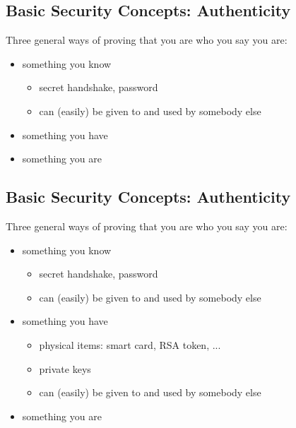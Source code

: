 \documentclass[xga]{xdvislides}
\begin{document}
\subsection{Basic Security Concepts: Authenticity}
Three general ways of proving that you are who you say you are:
\begin{itemize}
	\item something you know
		\begin{itemize}
			\item secret handshake, password
			\item can (easily) be given to and used by somebody else
		\end{itemize}
	\item something you have
	\item something you are
\end{itemize}

\subsection{Basic Security Concepts: Authenticity}
Three general ways of proving that you are who you say you are:
\begin{itemize}
	\item something you know
		\begin{itemize}
			\item secret handshake, password
			\item can (easily) be given to and used by somebody else
		\end{itemize}
	\item something you have
		\begin{itemize}
			\item physical items: smart card, RSA token, ...
			\item private keys
			\item can (easily) be given to and used by somebody else
		\end{itemize}
	\item something you are
\end{itemize}
\end{document}
